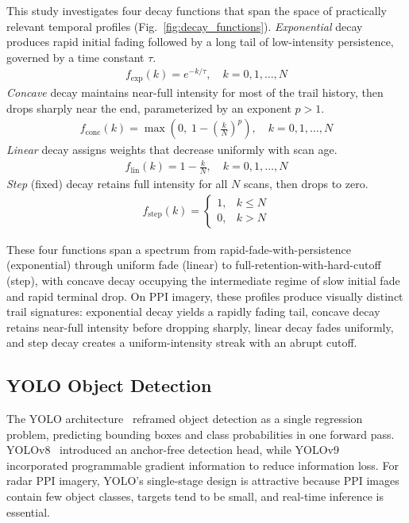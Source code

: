 \documentclass[colorlinks,upint,balance]{asmeconf}
\begin{document}
This study investigates four decay functions that span the space of practically relevant temporal profiles (Fig.~\ref{fig:decay_functions}). \textit{Exponential} decay produces rapid initial fading followed by a long tail of low-intensity persistence, governed by a time constant $\tau$.
\begin{align}
	f_{\mathrm{exp}}(k) = e^{-k/\tau}, \quad k = 0, 1, \ldots, N
	\label{eq:exp_decay}
\end{align}
\textit{Concave} decay maintains near-full intensity for most of the trail history, then drops sharply near the end, parameterized by an exponent $p > 1$.
\begin{align}
	f_{\mathrm{conc}}(k) = \max\!\left(0,\; 1 - \left(\frac{k}{N}\right)^{p}\right), \quad k = 0, 1, \ldots, N
	\label{eq:concave_decay}
\end{align}
\textit{Linear} decay assigns weights that decrease uniformly with scan age.
\begin{align}
	f_{\mathrm{lin}}(k) = 1 - \frac{k}{N}, \quad k = 0, 1, \ldots, N
	\label{eq:linear_decay}
\end{align}
\textit{Step} (fixed) decay retains full intensity for all $N$ scans, then drops to zero.
\begin{align}
	f_{\mathrm{step}}(k) = \begin{cases} 1, & k \leq N \\ 0, & k > N \end{cases}
	\label{eq:step_decay}
\end{align}

These four functions span a spectrum from rapid-fade-with-persistence (exponential) through uniform fade (linear) to full-retention-with-hard-cutoff (step), with concave decay occupying the intermediate regime of slow initial fade and rapid terminal drop. On PPI imagery, these profiles produce visually distinct trail signatures: exponential decay yields a rapidly fading tail, concave decay retains near-full intensity before dropping sharply, linear decay fades uniformly, and step decay creates a uniform-intensity streak with an abrupt cutoff.

\subsection{YOLO Object Detection}

The YOLO architecture~\cite{Redmon2016YOLO} reframed object detection as a single regression problem, predicting bounding boxes and class probabilities in one forward pass. YOLOv8~\cite{Jocher2023YOLOv8} introduced an anchor-free detection head, while YOLOv9~\cite{Wang2024YOLOv9} incorporated programmable gradient information to reduce information loss. For radar PPI imagery, YOLO's single-stage design is attractive because PPI images contain few object classes, targets tend to be small, and real-time inference is essential.
\end{document}
